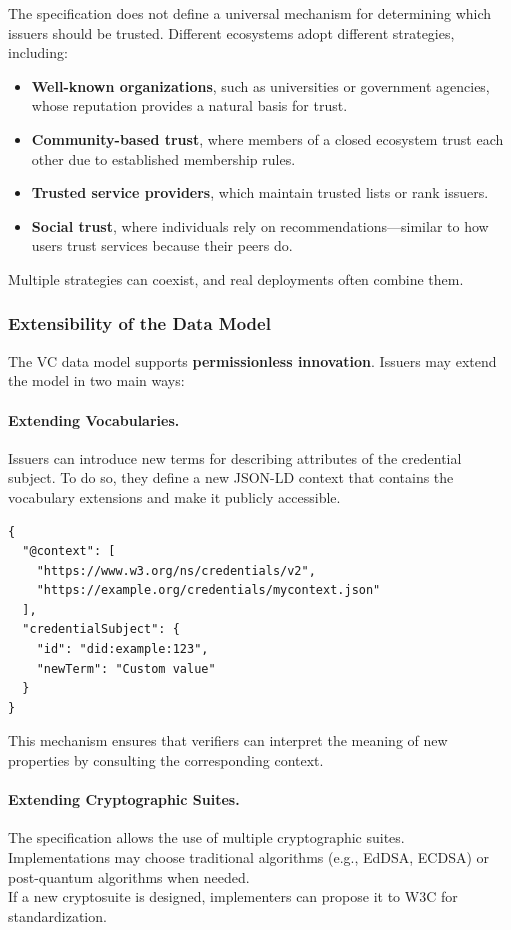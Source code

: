 The specification does not define a universal mechanism for determining which
issuers should be trusted.  
Different ecosystems adopt different strategies, including:

\begin{itemize}
    \item \textbf{Well-known organizations}, such as universities or government agencies,
    whose reputation provides a natural basis for trust.
    \item \textbf{Community-based trust}, where members of a closed ecosystem trust each
    other due to established membership rules.
    \item \textbf{Trusted service providers}, which maintain trusted lists or rank issuers.
    \item \textbf{Social trust}, where individuals rely on recommendations—similar to how
    users trust services because their peers do.
\end{itemize}

\noindent
Multiple strategies can coexist, and real deployments often combine them.

\medskip

\subsubsection*{Extensibility of the Data Model}

The VC data model supports \textbf{permissionless innovation}.  
Issuers may extend the model in two main ways:

\paragraph{Extending Vocabularies.}
Issuers can introduce new terms for describing attributes of the credential
subject.  
To do so, they define a new JSON-LD context that contains the vocabulary
extensions and make it publicly accessible.

\begin{verbatim}
{
  "@context": [
    "https://www.w3.org/ns/credentials/v2",
    "https://example.org/credentials/mycontext.json"
  ],
  "credentialSubject": {
    "id": "did:example:123",
    "newTerm": "Custom value"
  }
}
\end{verbatim}

\noindent
This mechanism ensures that verifiers can interpret the meaning of new
properties by consulting the corresponding context.

\paragraph{Extending Cryptographic Suites.} 
The specification allows the use of multiple cryptographic suites. \\
Implementations may choose traditional algorithms (e.g., EdDSA, ECDSA) or
post-quantum algorithms when needed.\\
If a new cryptosuite is designed, implementers can propose it to W3C for
standardization.
\medskip

